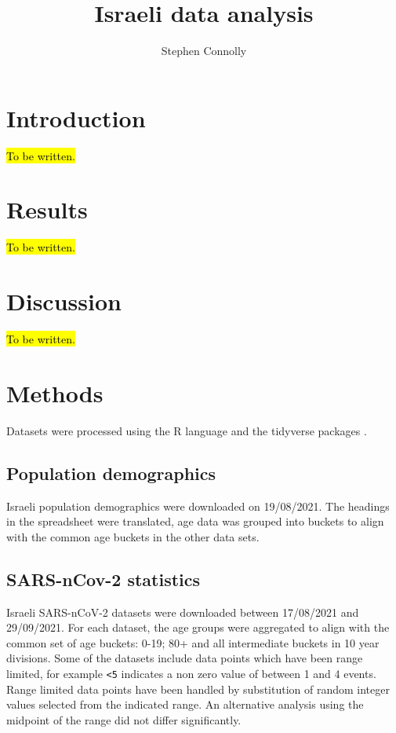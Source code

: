 \documentclass[fleqn,10pt]{wlscirep}
\title{Israeli data analysis}
\author[1,*]{Stephen Connolly}
\affil[1]{Independent Researcher, Dublin, Ireland}
\affil[*]{stephen alan connolly at gmail com}
\begin{document}
\flushbottom
\maketitle
%
%
\thispagestyle{empty}

\section*{Introduction}

\hl{To be written.}

\section*{Results}

\hl{To be written.}

\section*{Discussion}

\hl{To be written.}

\section*{Methods}

Datasets were processed using the R language \cite{RLanguage:2020} and the tidyverse packages \cite{Tidyverse:2019}.

\subsection*{Population demographics}

Israeli population demographics\cite{CbsGovIl:2021} were downloaded on 19/08/2021.
The headings in the spreadsheet were translated, age data was grouped into buckets to align with the common age buckets in the other data sets.

\subsection*{SARS-nCov-2 statistics}

Israeli SARS-nCoV-2 datasets\cite{DataGovIl:2021} were downloaded between 17/08/2021 and 29/09/2021.
For each dataset, the age groups were aggregated to align with the common set of age buckets: 0-19; 80+ and all intermediate buckets in 10 year divisions.
Some of the datasets include data points which have been range limited, for example \texttt{<5} indicates a non zero value of between 1 and 4 events.
Range limited data points have been handled by substitution of random integer values selected from the indicated range.
An alternative analysis using the midpoint of the range did not differ significantly.
\end{document}
